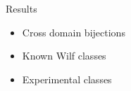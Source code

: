 \begin{frame}{Results}
    \begin{itemize}
        \item Cross domain bijections
        \item Known Wilf classes
        \item Experimental classes
    \end{itemize}
\end{frame}